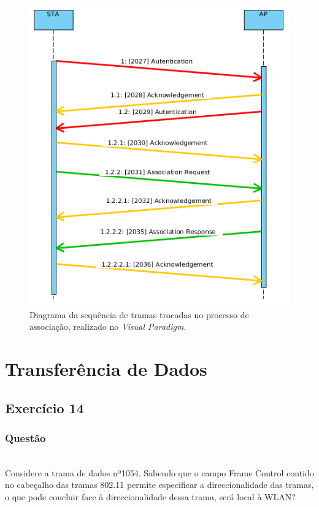 \documentclass{llncs}
\begin{document}
\begin{figure}
  \begin{center}
  \includegraphics[scale=0.6]{./imagens/diag_assoc_seq.png} 
  \end{center}
  \caption{Diagrama da sequência de tramas trocadas no processo de associação, realizado no \textit{Visual Paradigm}.}
  \label{fig:diag_assoc_seq}
\end{figure}




\clearpage

\section{Transferência de Dados}
\subsection{Exercício 14}
\subsubsection{Questão}\rule[-10pt]{0pt}{10pt}\\

Considere a trama de dados nº1054. Sabendo que o campo Frame Control contido no cabeçalho das tramas 802.11 permite especificar a direccionalidade das tramas, o que pode concluir face à direccionalidade dessa trama, será local à WLAN?
\end{document}
